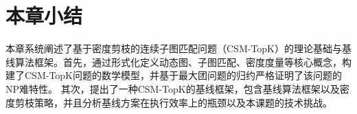 
\section{本章小结}
本章系统阐述了基于密度剪枝的连续子图匹配问题（CSM-TopK）的理论基础与基线算法框架。首先，通过形式化定义动态图、子图匹配、密度度量等核心概念，构建了CSM-TopK问题的数学模型，并基于最大团问题的归约严格证明了该问题的NP难特性。
其次，提出了一种CSM-TopK的基线框架，包含基线算法框架以及密度剪枝策略，并且分析基线方案在执行效率上的瓶颈以及本课题的技术挑战。


